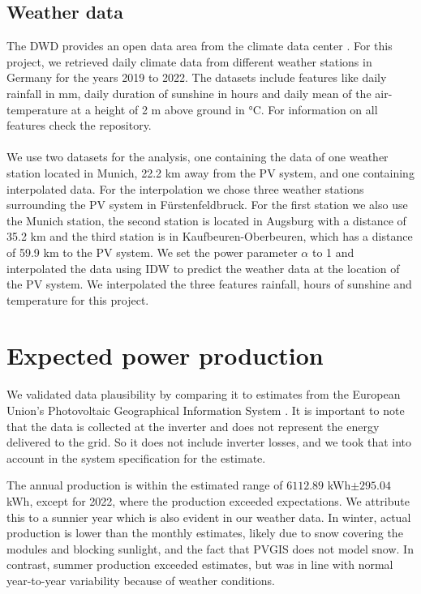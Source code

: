 \documentclass{article}
\begin{document}
\subsection{Weather data}
The DWD provides an open data area from the climate data center \cite{CDC}. 
For this project, we retrieved daily climate data from different weather stations in Germany for the years 2019 to 2022. 
The datasets include features like daily rainfall in mm, daily duration of sunshine in hours and daily mean of the air-temperature at a height of 2 m above ground in °C. 
For information on all features check the repository. \\ 
\\
We use two datasets for the analysis, one containing the data of one weather station located in Munich, 22.2 km away from the PV system, and one containing interpolated data. For the interpolation we chose three weather stations surrounding the PV system in Fürstenfeldbruck. 
For the first station we also use the Munich station, the second station is located in Augsburg with a distance of 35.2 km and the third station is in Kaufbeuren-Oberbeuren, which has a distance of 59.9 km to the PV system. 
We set the power parameter $\alpha$ to 1 and interpolated the data using IDW to predict the weather data at the location of the PV system. We interpolated the three features rainfall, hours of sunshine and temperature for this project.

\section{Expected power production}\label{sec:methods}

We validated data plausibility by comparing it to estimates from the European Union's Photovoltaic Geographical Information System \cite{PVGIS}. It is important to note that the data is collected at the inverter and does not represent the energy delivered to the grid. So it does not include inverter losses, and we took that into account in the system specification for the estimate.

The annual production is within the estimated range of $6112.89$ kWh$ \pm 295.04$ kWh, except for 2022, where the production exceeded expectations. We attribute this to a sunnier year \citep{DWD2022} which is also evident in our weather data. In winter, actual production is lower than the monthly estimates, likely due to snow covering the modules and blocking sunlight, and the fact that PVGIS does not model snow. In contrast, summer production exceeded estimates, but was in line with normal year-to-year variability because of weather conditions. 
\end{document}
